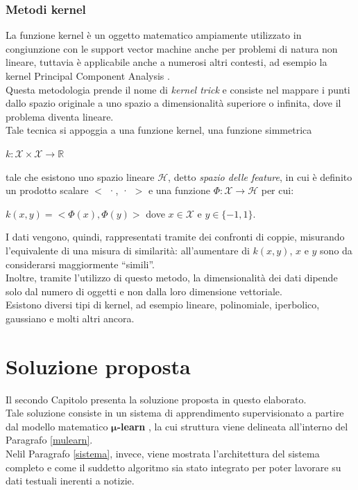 \documentclass[12pt]{report}
\theoremstyle{definition}
\begin{document}
\subsection{Metodi kernel} \label{kernel}
La funzione kernel è un oggetto matematico ampiamente utilizzato in congiunzione con le support vector machine \cite{28} anche per problemi di natura non lineare, tuttavia è applicabile anche a numerosi altri contesti, ad esempio la kernel Principal Component Analysis \cite{29}.
\\
Questa metodologia prende il nome di \textit{kernel trick} e consiste nel mappare i punti dallo spazio originale a uno spazio a dimensionalità superiore o infinita, dove il problema diventa lineare.
\\
Tale tecnica si appoggia a una funzione kernel, una funzione simmetrica 
\begin{center}
    $k: \mathcal{X} \times \mathcal{X} \rightarrow \mathbb{R}$
\end{center} 
tale che esistono uno spazio lineare $\mathcal{H}$, detto \textit{spazio delle feature}, in cui è definito un prodotto scalare $<$ ·, · $>$ e una funzione $\mathit{\Phi }: \mathcal{X} \rightarrow \mathcal{H}$ per cui:
\begin{center}
    $k(x,y) = < \mathit{\Phi}(x), \mathit{\Phi}(y) >$ dove $x \in \mathcal{X}$ e $y \in \{-1,1\}$.
\end{center}
I dati vengono, quindi, rappresentati tramite dei confronti di coppie, misurando l'equivalente di una misura di similarità: all'aumentare di $k(x,y)$, $x$ e $y$ sono da considerarsi maggiormente  ``simili''.
\\
Inoltre, tramite l'utilizzo di questo metodo, la dimensionalità dei dati dipende solo dal numero di oggetti e non dalla loro dimensione vettoriale.
\\
Esistono diversi tipi di kernel, ad esempio lineare, polinomiale, iperbolico, gaussiano e molti altri ancora.

\chapter{Soluzione proposta}
\label{Capitolo 2}
\onehalfspacing
Il secondo Capitolo presenta la soluzione proposta in questo elaborato.
\\
Tale soluzione consiste in un sistema di apprendimento supervisionato a partire dal modello matematico $\bm{\mu}$\textbf{-learn} \cite{1}, la cui struttura viene delineata all'interno del Paragrafo \ref{mulearn}.
\\
Nelil Paragrafo \ref{sistema}, invece, viene mostrata l'architettura del sistema completo e come il suddetto algoritmo sia stato integrato per poter lavorare su dati testuali inerenti a notizie.
\end{document}
